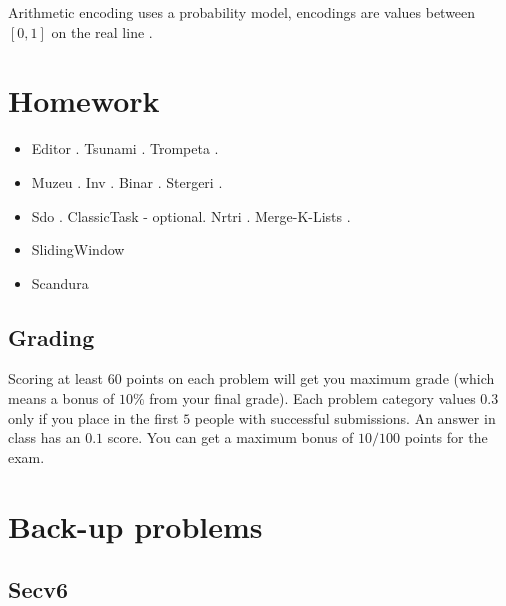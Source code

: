 \documentclass{llncs}
\begin{document}
Arithmetic encoding uses a probability model, encodings are values between $[0, 1]$ on the real line \cite{website:ArithmeticEncoding}.


\section{Homework}

\begin{itemize}
	\item Editor \cite{website:infoarena/editor}. Tsunami \cite{website:infoarena/tsunami}. Trompeta \cite{website:infoarena/trompeta}.
	\item Muzeu \cite{website:infoarena/muzeu}. Inv \cite{website:infoarena/inv}. Binar \cite{website:infoarena/binar}. Stergeri \cite{website:infoarena/stergeri}. 
	\item Sdo \cite{website:infoarena/sdo}. ClassicTask \cite{website:infoarena/classictask} - optional. Nrtri \cite{website:infoarena/nrtri}. Merge-K-Lists \cite{website:leetcode/merge}.
	\item SlidingWindow \cite{website:infoarena/slidingwindow}
	\item Scandura \cite{website:infoarena/scandura}
\end{itemize}

\subsection{Grading} Scoring at least $60$ points on each problem will get you maximum grade (which means a bonus of $10\%$ from your final grade). Each problem category values $0.3$ only if you place in the first $5$ people with successful submissions. An answer in class has an $0.1$ score. You can get a maximum bonus of $10/100$ points for the exam.

%
%
%

\section{Back-up problems}

\subsection{Secv6 \cite{website:infoarena/secv6}}
\end{document}
